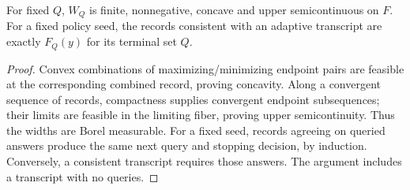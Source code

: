 \begin{proposition}
\label{prop:risk_concavity_transcript}
For fixed $Q$, $W_Q$ is finite, nonnegative, concave and upper
semicontinuous on $F$. For a fixed policy seed, the records consistent
with an adaptive transcript are exactly $F_Q(y)$ for its terminal set $Q$.
\end{proposition}
\begin{proof}
Convex combinations of maximizing/minimizing endpoint pairs are feasible
at the corresponding combined record, proving concavity. Along a
convergent sequence of records, compactness supplies convergent endpoint
subsequences; their limits are feasible in the limiting fiber, proving
upper semicontinuity. Thus the widths are Borel measurable. For a fixed
seed, records agreeing on queried answers produce the same next query
and stopping decision, by induction. Conversely, a consistent transcript
requires those answers. The argument includes a transcript with no queries.
\end{proof}
